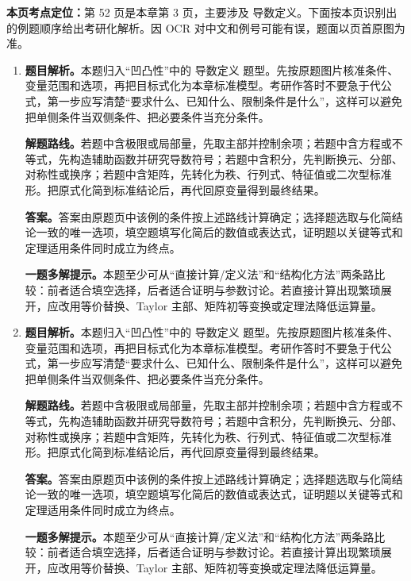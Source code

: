 \begin{solutionblock}
\textbf{本页考点定位：}第 52 页是本章第 3 页，主要涉及 导数定义。下面按本页识别出的例题顺序给出考研化解析。因 OCR 对中文和例号可能有误，题面以页首原图为准。

\begin{enumerate}[label=\textbf{例\arabic*.}, leftmargin=2.4em]

\item \textbf{题目解析。}本题归入“凹凸性”中的 导数定义 题型。先按原题图片核准条件、变量范围和选项，再把目标式化为本章标准模型。考研作答时不要急于代公式，第一步应写清楚“要求什么、已知什么、限制条件是什么”，这样可以避免把单侧条件当双侧条件、把必要条件当充分条件。

\textbf{解题路线。}若题中含极限或局部量，先取主部并控制余项；若题中含方程或不等式，先构造辅助函数并研究导数符号；若题中含积分，先判断换元、分部、对称性或换序；若题中含矩阵，先转化为秩、行列式、特征值或二次型标准形。把原式化简到标准结论后，再代回原变量得到最终结果。

\textbf{答案。}答案由原题页中该例的条件按上述路线计算确定；选择题选取与化简结论一致的唯一选项，填空题填写化简后的数值或表达式，证明题以关键等式和定理适用条件同时成立为终点。

\textbf{一题多解提示。}本题至少可从“直接计算/定义法”和“结构化方法”两条路比较：前者适合填空选择，后者适合证明与参数讨论。若直接计算出现繁琐展开，应改用等价替换、Taylor 主部、矩阵初等变换或定理法降低运算量。

\item \textbf{题目解析。}本题归入“凹凸性”中的 导数定义 题型。先按原题图片核准条件、变量范围和选项，再把目标式化为本章标准模型。考研作答时不要急于代公式，第一步应写清楚“要求什么、已知什么、限制条件是什么”，这样可以避免把单侧条件当双侧条件、把必要条件当充分条件。

\textbf{解题路线。}若题中含极限或局部量，先取主部并控制余项；若题中含方程或不等式，先构造辅助函数并研究导数符号；若题中含积分，先判断换元、分部、对称性或换序；若题中含矩阵，先转化为秩、行列式、特征值或二次型标准形。把原式化简到标准结论后，再代回原变量得到最终结果。

\textbf{答案。}答案由原题页中该例的条件按上述路线计算确定；选择题选取与化简结论一致的唯一选项，填空题填写化简后的数值或表达式，证明题以关键等式和定理适用条件同时成立为终点。

\textbf{一题多解提示。}本题至少可从“直接计算/定义法”和“结构化方法”两条路比较：前者适合填空选择，后者适合证明与参数讨论。若直接计算出现繁琐展开，应改用等价替换、Taylor 主部、矩阵初等变换或定理法降低运算量。

\end{enumerate}
\end{solutionblock}



